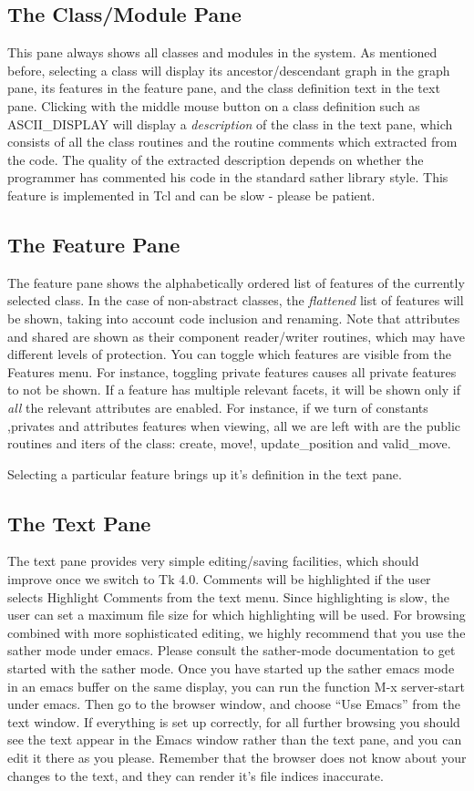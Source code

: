 \subsection{The Class/Module Pane}
	This pane always shows all classes and modules in the system.
As mentioned before, selecting a class will display its
ancestor/descendant graph in the graph pane, its features in the
feature pane, and the class definition text in the text pane. Clicking
with the middle mouse button on a class definition such as
ASCII_DISPLAY will display a {\em description} of the class in the
text pane, which consists of all the class routines and the routine
comments which extracted from the code.  The quality of the extracted
description depends on whether the programmer has commented his code
in the standard sather library style. This feature is implemented in
Tcl and can be slow - please be patient.

\subsection{The Feature Pane}
	The feature pane shows the alphabetically ordered list of
features of the currently selected class.  In the case of non-abstract
classes, the {\em flattened} list of features will be shown, taking
into account code inclusion and renaming. Note that attributes and
shared are shown as their component reader/writer routines, which may
have different levels of protection.  You can toggle which features
are visible from the Features menu.  For instance, toggling private
features causes all private features to not be shown. If a feature has
multiple relevant facets, it will be shown only if {\em all} the
relevant attributes are enabled. For instance, if we turn of constants
,privates and attributes features when viewing, all we are left with
are the public routines and iters of the class: create, move!,
update_position and valid_move. 

	Selecting a particular feature brings up it's definition in
the text pane.
	
\subsection{The Text Pane}
	The text pane provides very simple editing/saving facilities,
which should improve once we switch to Tk 4.0. Comments will be
highlighted if the user selects Highlight Comments from the text
menu. Since highlighting is slow, the user can set a maximum file size
for which highlighting will be used.  For browsing combined with more
sophisticated editing, we highly recommend that you use the sather
mode under emacs. Please consult the sather-mode documentation to get
started with the sather mode.  Once you have started up the sather
emacs mode in an emacs buffer on the same display, you can run the
function M-x server-start under emacs. Then go to the browser window,
and choose ``Use Emacs'' from the text window.  If everything is set
up correctly, for all further browsing you should see the text appear
in the Emacs window rather than the text pane, and you can edit it
there as you please.  Remember that the browser does not know about
your changes to the text, and they can render it's file indices
inaccurate.

